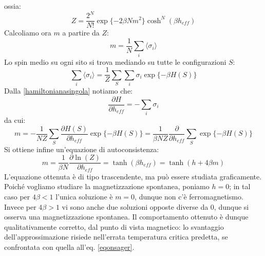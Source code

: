 \documentclass[Lau, noexaminfo, oneside]{sapthesis} %
\begin{document}
ossia:
\begin{equation}
Z = \frac{2^N}{N!} \exp \lbrace - 2 \beta  N m^2 \rbrace \cosh^N(\beta h_{eff})
\end{equation}
Calcoliamo ora $m$ a partire da $Z$:
\begin{equation}
m = \frac{1}{N} \sum_i \langle \sigma_i \rangle
\end{equation}
Lo spin medio su ogni sito si trova mediando su tutte le configurazioni $S$:
\begin{equation}
\sum_i \langle \sigma_i \rangle = \frac{1}{Z} \sum_{S} \sum_i \sigma_i  \exp\lbrace-\beta H(S)\rbrace
\end{equation}
Dalla \eqref{hamiltonianasingola} notiamo che:
\begin{equation}
\frac{\partial H}{\partial h_{eff}} = - \sum_i \sigma_i 
\end{equation}
da cui:
\begin{equation}
m = - \frac{1}{NZ} \sum_{S} \frac{\partial H(S)}{\partial h_{eff}} \exp\lbrace-\beta H(S)\rbrace = \frac{1}{\beta NZ} \frac{\partial}{\partial h_{eff}} \sum_{S} \exp\lbrace-\beta H(S)\rbrace
\end{equation}
Si ottiene infine un'equazione di autoconsistenza:
\begin{equation}
m = \frac{1}{\beta N} \frac{\partial \ln(Z)}{\partial h_{eff}} = \tanh(\beta h_{eff})= \tanh(h+4\beta m)
\end{equation}
L'equazione ottenuta è di tipo trascendente, ma può essere studiata graficamente.
Poiché vogliamo studiare la magnetizzazione spontanea, poniamo $h=0$; in tal caso per $4\beta<1$ l'unica soluzione è $m=0$, dunque non c'è ferromagnetismo. Invece per $4\beta>1$ vi sono anche due soluzioni opposte diverse da 0, dunque si osserva una magnetizzazione spontanea.
Il comportamento ottenuto è dunque qualitativamente corretto, dal punto di vista magnetico: lo svantaggio dell'approssimazione risiede nell'errata temperatura critica predetta, se confrontata con quella all'eq. \eqref{eqonsager}.
\end{document}
